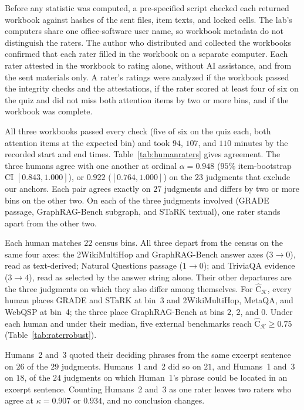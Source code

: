 \documentclass[11pt]{article}
\newcommand{\Chat}{\widehat{\mathrm{C}}}
\newcommand{\kg}{\mathcal{K}}
\begin{document}
Before any statistic was computed, a pre-specified script checked each returned workbook against hashes of the sent files, item texts, and locked cells. The lab's computers share one office-software user name, so workbook metadata do not distinguish the raters. The author who distributed and collected the workbooks confirmed that each rater filled in the workbook on a separate computer. Each rater attested in the workbook to rating alone, without AI assistance, and from the sent materials only. A rater's ratings were analyzed if the workbook passed the integrity checks and the attestations, if the rater scored at least four of six on the quiz and did not miss both attention items by two or more bins, and if the workbook was complete.

All three workbooks passed every check (five of six on the quiz each, both attention items at the expected bin) and took $94$, $107$, and $110$ minutes by the recorded start and end times. Table~\ref{tab:humanraters} gives agreement. The three humans agree with one another at ordinal $\alpha=0.948$ ($95\%$ item-bootstrap CI $[0.843,1.000]$), or $0.922$ ($[0.764,1.000]$) on the $23$ judgments that exclude our anchors. Each pair agrees exactly on $27$ judgments and differs by two or more bins on the other two. On each of the three judgments involved (GRADE passage, GraphRAG-Bench subgraph, and STaRK textual), one rater stands apart from the other two.

Each human matches $22$ census bins. All three depart from the census on the same four axes: the 2WikiMultiHop and GraphRAG-Bench answer axes ($3\to0$), read as text-derived; Natural Questions passage ($1\to0$); and TriviaQA evidence ($3\to4$), read as selected by the answer string alone. Their other departures are the three judgments on which they also differ among themselves. For $\Chat_{\kg}$, every human places GRADE and STaRK at bin~3 and 2WikiMultiHop, MetaQA, and WebQSP at bin~4; the three place GraphRAG-Bench at bins $2$, $2$, and $0$. Under each human and under their median, five external benchmarks reach $\Chat_{\kg}\geq0.75$ (Table~\ref{tab:raterrobust}).

Humans~2 and~3 quoted their deciding phrases from the same excerpt sentence on $26$ of the $29$ judgments. Humans~1 and~2 did so on $21$, and Humans~1 and~3 on $18$, of the $24$ judgments on which Human~1's phrase could be located in an excerpt sentence. Counting Humans~2 and~3 as one rater leaves two raters who agree at $\kappa=0.907$ or $0.934$, and no conclusion changes.
\end{document}
